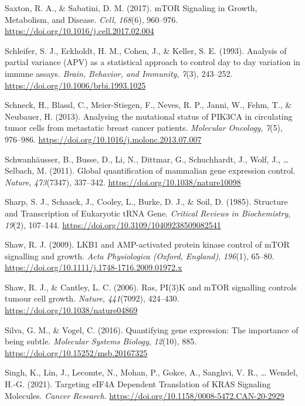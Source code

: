 \documentclass[12pt,openany]{book}
\begin{document}
\hypertarget{ref-Saxton2017}{}
Saxton, R. A., \& Sabatini, D. M. (2017). mTOR Signaling in Growth,
Metabolism, and Disease. \emph{Cell}, \emph{168}(6), 960--976.
\url{https://doi.org/10.1016/j.cell.2017.02.004}

\hypertarget{ref-Schleifer1993}{}
Schleifer, S. J., Eckholdt, H. M., Cohen, J., \& Keller, S. E. (1993).
Analysis of partial variance (APV) as a statistical approach to control
day to day variation in immune assays. \emph{Brain, Behavior, and
Immunity}, \emph{7}(3), 243--252.
\url{https://doi.org/10.1006/brbi.1993.1025}

\hypertarget{ref-Schneck2013}{}
Schneck, H., Blassl, C., Meier-Stiegen, F., Neves, R. P., Janni, W.,
Fehm, T., \& Neubauer, H. (2013). Analysing the mutational status of
PIK3CA in circulating tumor cells from metastatic breast cancer
patients. \emph{Molecular Oncology}, \emph{7}(5), 976--986.
\url{https://doi.org/10.1016/j.molonc.2013.07.007}

\hypertarget{ref-Schwanhausser2011}{}
Schwanhäusser, B., Busse, D., Li, N., Dittmar, G., Schuchhardt, J.,
Wolf, J., \ldots{} Selbach, M. (2011). Global quantification of
mammalian gene expression control. \emph{Nature}, \emph{473}(7347),
337--342. \url{https://doi.org/10.1038/nature10098}

\hypertarget{ref-Sharp1985}{}
Sharp, S. J., Schaack, J., Cooley, L., Burke, D. J., \& Soil, D. (1985).
Structure and Transcription of Eukaryotic tRNA Gene. \emph{Critical
Reviews in Biochemistry}, \emph{19}(2), 107--144.
\url{https://doi.org/10.3109/10409238509082541}

\hypertarget{ref-Shaw2009}{}
Shaw, R. J. (2009). LKB1 and AMP-activated protein kinase control of
mTOR signalling and growth. \emph{Acta Physiologica (Oxford, England)},
\emph{196}(1), 65--80.
\url{https://doi.org/10.1111/j.1748-1716.2009.01972.x}

\hypertarget{ref-Shaw2006}{}
Shaw, R. J., \& Cantley, L. C. (2006). Ras, PI(3)K and mTOR signalling
controls tumour cell growth. \emph{Nature}, \emph{441}(7092), 424--430.
\url{https://doi.org/10.1038/nature04869}

\hypertarget{ref-Silva2016}{}
Silva, G. M., \& Vogel, C. (2016). Quantifying gene expression: The
importance of being subtle. \emph{Molecular Systems Biology},
\emph{12}(10), 885. \url{https://doi.org/10.15252/msb.20167325}

\hypertarget{ref-Singh2021}{}
Singh, K., Lin, J., Lecomte, N., Mohan, P., Gokce, A., Sanghvi, V. R.,
\ldots{} Wendel, H.-G. (2021). Targeting eIF4A Dependent Translation of
KRAS Signaling Molecules. \emph{Cancer Research}.
\url{https://doi.org/10.1158/0008-5472.CAN-20-2929}
\end{document}
